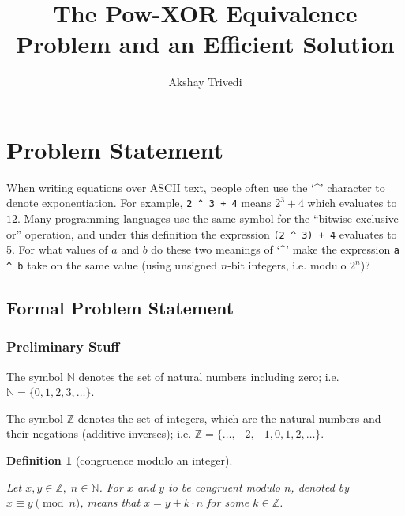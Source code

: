\documentclass[1gpt]{article}
\title{The Pow-XOR Equivalence Problem and an Efficient Solution}
\author{Akshay Trivedi}
\date{\vspace{-3em}}
\theoremstyle{break}
\newtheorem{definition}[theorem]{Definition}
\theoremstyle{nonumberbreak}
\newenvironment{Def}[2]{\begin{definition}[#1]\label{Def:#2}}{\end{definition}}
\newcommand{\NN}{\mathbb{N}}
\newcommand{\ZZ}{\mathbb{Z}}
\begin{document}
\maketitle

\section{Problem Statement}

When writing equations over ASCII text, people often use the `\textasciicircum' character to denote exponentiation. For example, \texttt{2 {\textasciicircum} 3 + 4} means $2^3+4$ which evaluates to $12$. Many programming languages use the same symbol for the ``bitwise exclusive or'' operation, and under this definition
the expression \texttt{(2 {\textasciicircum} 3) + 4} evaluates to 5. For what values of $a$ and $b$ do these two meanings of `\textasciicircum' make the expression \texttt{a {\textasciicircum} b} take on the same value (using unsigned $n$-bit integers, i.e. modulo $2^n$)?

\subsection{Formal Problem Statement}

\subsubsection{Preliminary Stuff}

The symbol $\NN$ denotes the set of natural numbers including zero; i.e. $\NN = \{0, 1, 2, 3, \ldots\}$.

The symbol $\ZZ$ denotes the set of integers, which are the natural numbers and their negations (additive inverses); i.e. $\ZZ = \{\ldots, -2, -1, 0, 1, 2, \ldots\}$.

\begin{Def}{congruence modulo an integer}{mod}

    Let $x, y \in \ZZ,\; n \in \NN$. For $x$ and $y$ to be congruent modulo $n$, denoted by $x \equiv y \pmod{n}$, means that $x = y + k \cdot n$ for some $k \in \ZZ$. %

\end{Def}
\end{document}
